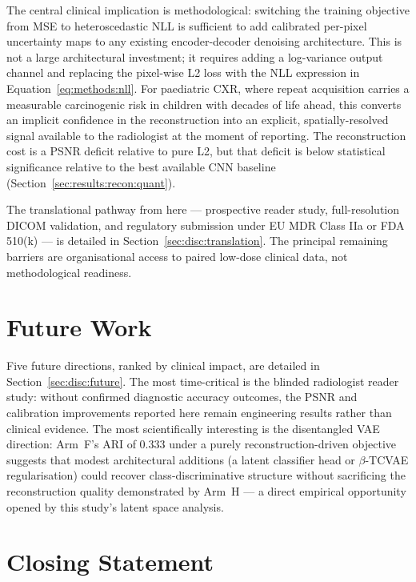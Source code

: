 \documentclass[12pt, a4paper, twoside, openright]{book}
\begin{document}
The central clinical implication is methodological: switching the training objective from MSE to heteroscedastic NLL is sufficient to add calibrated per-pixel uncertainty maps to any existing encoder-decoder denoising architecture. This is not a large architectural investment; it requires adding a log-variance output channel and replacing the pixel-wise L2 loss with the NLL expression in Equation~\ref{eq:methods:nll}. For paediatric CXR, where repeat acquisition carries a measurable carcinogenic risk in children with decades of life ahead, this converts an implicit confidence in the reconstruction into an explicit, spatially-resolved signal available to the radiologist at the moment of reporting. The reconstruction cost is a PSNR deficit relative to pure L2, but that deficit is below statistical significance relative to the best available CNN baseline (Section~\ref{sec:results:recon:quant}).

The translational pathway from here --- prospective reader study, full-resolution DICOM validation, and regulatory submission under EU MDR Class IIa or FDA 510(k) --- is detailed in Section~\ref{sec:disc:translation}. The principal remaining barriers are organisational access to paired low-dose clinical data, not methodological readiness.

\section{Future Work}
\label{sec:conc:future}

Five future directions, ranked by clinical impact, are detailed in Section~\ref{sec:disc:future}. The most time-critical is the blinded radiologist reader study: without confirmed diagnostic accuracy outcomes, the PSNR and calibration improvements reported here remain engineering results rather than clinical evidence. The most scientifically interesting is the disentangled VAE direction: Arm~F's ARI of $0.333$ under a purely reconstruction-driven objective suggests that modest architectural additions (a latent classifier head or $\beta$-TCVAE regularisation) could recover class-discriminative structure without sacrificing the reconstruction quality demonstrated by Arm~H --- a direct empirical opportunity opened by this study's latent space analysis.

\section{Closing Statement}
\label{sec:conc:closing}
\end{document}
